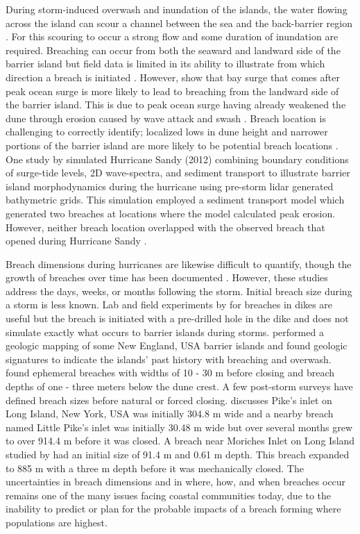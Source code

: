 \documentclass{coastal_paper}
\begin{document}
During storm-induced overwash and inundation of the islands, the water flowing across the island can scour a channel between the sea and the back-barrier region \citep{Kraus2003, Pierce1970, Roelvink2009}. For this scouring to occur a strong flow and some duration of inundation are required. Breaching can occur from both the seaward and landward side of the barrier island but field data is limited in its ability to illustrate from which direction a breach is initiated \citep{Kraus2003, Pierce1970, Smallegan2017}. However, \citet{Smallegan2017} show that bay surge that comes after peak ocean surge is more likely to lead to breaching from the landward side of the barrier island. This is due to peak ocean surge having already weakened the dune through erosion caused by wave attack and swash \citep{Kraus2003, Smallegan2017}. Breach location is challenging to correctly identify; localized lows in dune height and narrower portions of the barrier island are more likely to be potential breach locations \citep{Kraus2003, Kraus2003a}. One study by \citet{Vander2019} simulated Hurricane Sandy (2012) combining boundary conditions of surge-tide levels, 2D wave-spectra, and sediment transport to illustrate barrier island morphodynamics during the hurricane using pre-storm lidar generated bathymetric grids. This simulation employed a sediment transport model which generated two breaches at locations where the model calculated peak erosion. However, neither breach location overlapped with the observed breach that opened during Hurricane Sandy \citep{Vander2019}.

Breach dimensions during hurricanes are likewise difficult to quantify, though the growth of breaches over time has been documented \citep{Kraus2003a, Schmeltz1983Breach/InletInlet.}. However, these studies address the days, weeks, or months following the storm. Initial breach size during a storm is less known. Lab and field experiments by \citet{Visser1999} for breaches in dikes are useful but the breach is initiated with a pre-drilled hole in the dike and does not simulate exactly what occurs to barrier islands during storms. \citet{Buynevich2006} performed a geologic mapping of some New England, USA barrier islands and found geologic signatures to indicate the islands' past history with breaching and overwash. \citet{Buynevich2006} found ephemeral breaches with widths of 10 - 30 m before closing and breach depths of one - three meters below the dune crest. A few post-storm surveys have defined breach sizes before natural or forced closing. \cite{Kraus2003a} discusses Pike's inlet on Long Island, New York, USA was initially 304.8 m wide and a nearby breach named Little Pike's inlet was initially 30.48 m wide but over several months grew to over 914.4 m before it was closed. A breach near Moriches Inlet on Long Island studied by \cite{Schmeltz1983Breach/InletInlet.} had an initial size of 91.4 m and 0.61 m depth. This breach expanded to 885 m with a three m depth before it was mechanically closed. The uncertainties in breach dimensions and  in where, how, and when breaches occur remains one of the many issues facing coastal communities today, due to the inability to predict or plan for the probable impacts of a breach forming where populations are highest. 
\end{document}
